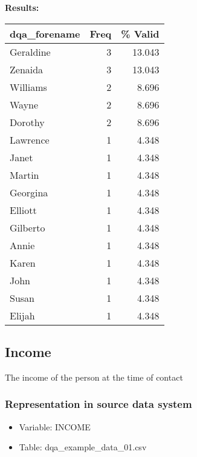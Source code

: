 \documentclass[
]{article}
\providecommand{\tightlist}{%
  \setlength{\itemsep}{0pt}\setlength{\parskip}{0pt}}
\begin{document}
\textbf{Results:}\\

\begin{table}[H]
\centering
\begin{tabular}{l|r|r}
\hline
\textbf{dqa\_forename} & \textbf{Freq} & \textbf{\% Valid}\\
\hline
Geraldine & 3 & 13.043\\
\hline
Zenaida & 3 & 13.043\\
\hline
Williams & 2 & 8.696\\
\hline
Wayne & 2 & 8.696\\
\hline
Dorothy & 2 & 8.696\\
\hline
Lawrence & 1 & 4.348\\
\hline
Janet & 1 & 4.348\\
\hline
Martin & 1 & 4.348\\
\hline
Georgina & 1 & 4.348\\
\hline
Elliott & 1 & 4.348\\
\hline
Gilberto & 1 & 4.348\\
\hline
Annie & 1 & 4.348\\
\hline
Karen & 1 & 4.348\\
\hline
John & 1 & 4.348\\
\hline
Susan & 1 & 4.348\\
\hline
Elijah & 1 & 4.348\\
\hline
\end{tabular}
\end{table}
\newpage

\hypertarget{income}{%
\subsection{Income}\label{income}}

The income of the person at the time of contact

\hypertarget{representation-in-source-data-system-7}{%
\subsubsection{\texorpdfstring{Representation in \textbf{source} data
system}{Representation in source data system}}\label{representation-in-source-data-system-7}}

\begin{itemize}
\tightlist
\item
  Variable: INCOME
\item
  Table: dqa\_example\_data\_01.csv
\end{itemize}
\end{document}
